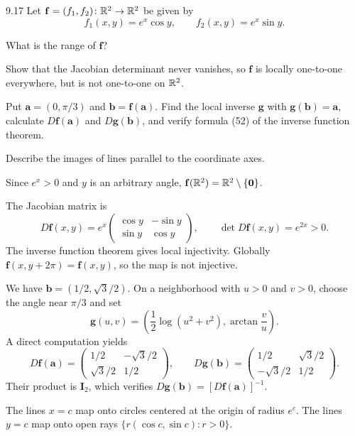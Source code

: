 \documentclass[11pt,oneside]{article}
\begin{document}
\begin{exercise}{9.17}
Let $\mathbf f=(f_1,f_2)\colon\mathbb{R}^2\to\mathbb{R}^2$ be given by
\[
 f_1(x,y)=e^x\cos y,\qquad f_2(x,y)=e^x\sin y.
\]
\begin{exercisesubparts}
\item What is the range of $\mathbf f$?
\item Show that the Jacobian determinant never vanishes, so $\mathbf f$ is locally one-to-one everywhere, but is not one-to-one on $\mathbb{R}^2$.
\item Put $\mathbf a=(0,\pi/3)$ and $\mathbf b=\mathbf f(\mathbf a)$. Find the local inverse $\mathbf g$ with $\mathbf g(\mathbf b)=\mathbf a$, calculate $D\mathbf f(\mathbf a)$ and $D\mathbf g(\mathbf b)$, and verify formula (52) of the inverse function theorem.
\item Describe the images of lines parallel to the coordinate axes.
\end{exercisesubparts}
\end{exercise}
\begin{solution}
\begin{exercisesubparts}
\item Since $e^x>0$ and $y$ is an arbitrary angle,
$\mathbf f(\mathbb{R}^2)=\mathbb{R}^2\setminus\{\mathbf0\}$.
\item The Jacobian matrix is
\[
 D\mathbf f(x,y)=e^x
 \begin{pmatrix}\cos y&-\sin y\\\sin y&\cos y\end{pmatrix},
 \qquad \det D\mathbf f(x,y)=e^{2x}>0.
\]
The inverse function theorem gives local injectivity. Globally $\mathbf f(x,y+2\pi)=\mathbf f(x,y)$, so the map is not injective.
\item We have $\mathbf b=(1/2,\sqrt3/2)$. On a neighborhood with $u>0$ and $v>0$, choose the angle near $\pi/3$ and set
\[
 \mathbf g(u,v)=\left(\frac12\log(u^2+v^2),\arctan\frac vu\right).
\]
A direct computation yields
\[
 D\mathbf f(\mathbf a)=
 \begin{pmatrix}1/2&-\sqrt3/2\\\sqrt3/2&1/2\end{pmatrix},\qquad
 D\mathbf g(\mathbf b)=
 \begin{pmatrix}1/2&\sqrt3/2\\-\sqrt3/2&1/2\end{pmatrix}.
\]
Their product is $\mathbf I_2$, which verifies $D\mathbf g(\mathbf b)=[D\mathbf f(\mathbf a)]^{-1}$.
\item The lines $x=c$ map onto circles centered at the origin of radius $e^c$. The lines $y=c$ map onto open rays $\{r(\cos c,\sin c):r>0\}$.
\end{exercisesubparts}
\end{solution}
\end{document}

